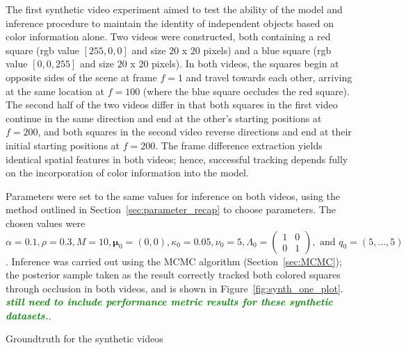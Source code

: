 \documentclass[smallcondensed, final]{svjour3}
\newcommand{\willie}[1]{\textcolor{green}{\textsf{\emph{\textbf{\textcolor{green}{#1}}}}}}
\begin{document}
The first synthetic video experiment aimed to test the ability of the model and inference procedure to maintain the identity of independent objects based on color information alone. Two videos were constructed, both containing a red square (rgb value $[255,0,0]$ and size $20$ x $20$ pixels) and a blue square (rgb value $[0,0,255]$ and size $20$ x $20$ pixels). In both videos, the squares begin at opposite sides of the scene at frame $f=1$ and travel towards each other, arriving at the same location at $f=100$ (where the blue square occludes the red square). The second half of the two videos differ in that both squares in the first video continue in the same direction and end at the other's starting positions at $f=200$, and both squares in the second video reverse directions and end at their initial starting positions at $f=200$. The frame difference extraction yields identical spatial features in both videos; hence, successful tracking depends fully on the incorporation of color information into the model.

Parameters were set to the same values for inference on both videos, using the method outlined in Section~\ref{sec:parameter_recap} to choose parameters. The chosen values were $\alpha = 0.1, \rho = 0.3, M = 10, \boldsymbol{\mu}_{0} = (0,0), \kappa_{0} = 0.05, \nu_{0} = 5, \Lambda_{0} = \left( \begin{smallmatrix} 1&0\\ 0&1 \end{smallmatrix} \right), \text{ and } q_{0} = (5, \ldots, 5)$. Inference was carried out using the MCMC algorithm (Section~\ref{sec:MCMC}); the posterior sample taken as the result correctly tracked both colored squares through occlusion in both videos, and is shown in Figure~\ref{fig:synth_one_plot}. \willie{still need to include performance metric results for these synthetic datasets.}.

Groundtruth for the synthetic videos 
\end{document}
